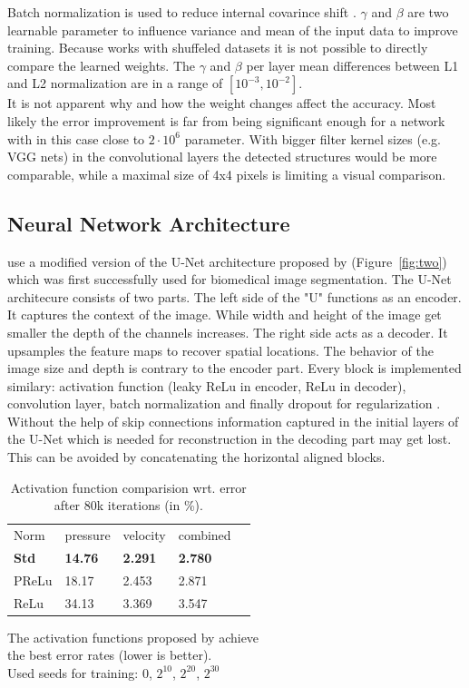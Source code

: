 \documentclass[acmtog]{techreportacmart}
\begin{document}
Batch normalization is used to reduce internal covarince shift \cite{ioffe2015}. 
$\gamma$ and $\beta$ are two learnable parameter to influence variance and mean of the input data to improve training. Because \cite{Thuerey20} works with shuffeled datasets it is not possible to directly compare the learned weights. The $\gamma$ and $\beta$ per layer mean differences between L1 and L2 normalization are in a range of $[10^{-3}, 10^{-2}]$. \\ 
It is not apparent why and how the weight changes affect the accuracy. Most likely the error improvement is far from being significant enough for a network with in this case close to $2 \cdot 10^{6}$ parameter. With bigger filter kernel sizes (e.g. VGG nets) in the convolutional layers the detected structures would be more comparable, while a maximal size of 4x4 pixels is limiting a visual comparison.

\subsection{Neural Network Architecture}
\cite{Thuerey20} use a modified version of the U-Net architecture proposed by \cite{ronneberger2015} (Figure~\ref{fig:two}) which was first successfully used for biomedical image segmentation.
The U-Net architecure consists of two parts. The left side of the "U" functions as an encoder. It captures the context of the image. While width and height of the image get smaller the depth of the channels increases. The right side acts as a decoder. It upsamples the feature maps to recover spatial locations. The behavior of the image size and depth is contrary to the encoder part. Every block is implemented similary: activation function (leaky ReLu in encoder, ReLu in decoder), convolution layer, batch normalization and finally dropout for regularization \cite{Thuerey20}. Without the help of skip connections information captured in the initial layers of the U-Net which is needed for reconstruction in the decoding part may get lost. This can be avoided by concatenating the horizontal aligned blocks.

\begin{table}[h]
\caption{Activation function comparision wrt. error \\ after 80k iterations (in \%).}
\label{tab:two}
\begin{center}
\begin{tabular}{l|l|l|l|l}
  \toprule
  Norm   & pressure   &	velocity    & combined \\
  \bf Std	 & \bf 14.76	  & \bf 2.291		& \bf 2.780	   \\
  PReLu	 & 18.17	  & 2.453		& 2.871	   \\
  ReLu	 & 34.13	  & 3.369		& 3.547	   \\
  \bottomrule
\end{tabular}
\end{center}
\bigskip\centering
\footnotesize The activation functions proposed by \cite{Thuerey20} achieve \\ 
the best error rates (lower is better). \\
Used seeds for training: $0$, $2^{10}$, $2^{20}$, $2^{30}$

\end{table}%
\end{document}
